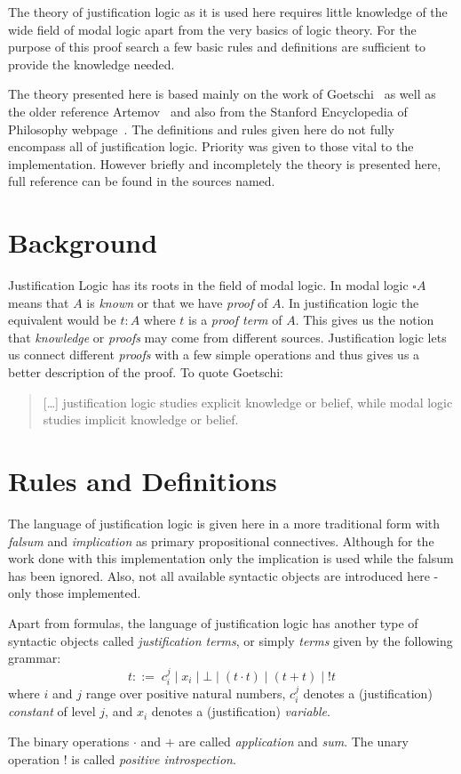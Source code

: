 The theory of justification logic as it is used here requires little knowledge of the wide field of modal logic apart from the very basics of logic theory. For the purpose of this proof search a few basic rules and definitions are sufficient to provide the knowledge needed. 

The theory presented here is based mainly on the work of Goetschi~\cite{goet} as well as the older reference Artemov~\cite{art} and also from the Stanford Encyclopedia of Philosophy webpage~\cite{stan}. The definitions and rules given here do not fully encompass all of justification logic. Priority was given to those vital to the implementation. However briefly and incompletely the theory is presented here, full reference can be found in the sources named. 

\section{Background}
Justification Logic has its roots in the field of modal logic. 
In modal logic $\square A$ means that $A$ is \emph{known} or that we have \emph{proof} of $A$. In justification logic the equivalent would be $t:A$ where $t$ is a \emph{proof term} of $A$. This gives us the notion that \emph{knowledge} or \emph{proofs} may come from different sources. Justification logic lets us connect different \emph{proofs} with a few simple operations and thus gives us a better description of the proof. To quote Goetschi: \begin{quote}[\dots] justification logic studies explicit knowledge or belief, while modal logic studies implicit knowledge or belief.\end{quote}

\section{Rules and Definitions}

The language of justification logic is given here in a more traditional form with \emph{falsum} and \emph{implication} as primary propositional connectives. Although for the work done with this implementation only the implication is used while the falsum has been ignored. Also, not all available syntactic objects are introduced here - only those implemented.

\begin{definition}\label{justification_terms} Apart from formulas, the language of justification logic has another type of syntactic objects called \emph{justification terms}, or simply \emph{terms} given by the following grammar:
\[
	t::=  \;c_{i}^{j}\; |\; x_i \;|\; \bot \; |\; (t \cdot t)\; |\; (t+t)\; |\; !t
\]
where $i$ and $j$ range over positive natural numbers, $c_{i}^{j}$ denotes a (justification) \emph{constant} of level $j$, and $x_i$ denotes a (justification) \emph{variable}.

The binary operations $\cdot$ and $+$ are called \emph{application} and \emph{sum}. The unary operation $!$ is called \emph{positive introspection}.
\end{definition}

